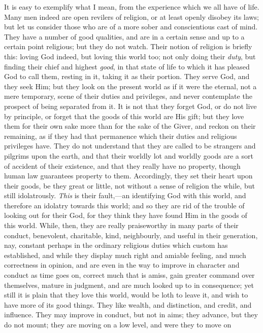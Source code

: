 It is easy to exemplify what I mean, from the experience which we
all have of life. Many men indeed are open revilers of religion, or at
least openly disobey its laws; but let us consider those who are of a
more sober and conscientious cast of mind. They have a number of good
qualities, and are in a certain sense and up to a certain point
religious; but they do not watch. Their notion of religion is briefly
this: loving God indeed, but loving this world too; not only doing
their \emph{duty}, but finding their chief and highest \emph{good}, in
that state of life to which it has pleased God to call them, resting
in it, taking it as their portion. They serve God, and they seek Him;
but they look on the present world as if it were the eternal, not a
mere temporary, scene of their duties and privileges, and never
contemplate the prospect of being separated from it. It is not that
they forget God, or do not live by principle, or forget that the goods
of this world are His gift; but they love them for their own sake more
than for the sake of the Giver, and reckon on their remaining, as if
they had that permanence which their duties and religious privileges
have. They do not understand that they are called to be strangers and
pilgrims upon the earth, and that their worldly lot and worldly goods
are a sort of accident of their existence, and that they really have
no property, though human law guarantees property to them.
Accordingly, they set their heart upon their goods, be they great or
little, not without a sense of religion the while, but still
idolatrously. \emph{This} is their fault,—an identifying God with
this world, and therefore an idolatry towards this world; and so they
are rid of the trouble of looking out for their God, for they think
they have found Him in the goods of this world. While, then, they are
really praiseworthy in many parts of their conduct, benevolent,
charitable, kind, neighbourly, and useful in their generation, nay,
constant perhaps in the ordinary religious duties which custom has
established, and while they display much right and amiable feeling,
and much correctness in opinion, and are even in the way to improve in
character and conduct as time goes on, correct much that is amiss,
gain greater command over themselves, mature in judgment, and are much
looked up to in consequence; yet still it is plain that they love this
world, would be loth to leave it, and wish to have more of its good
things. They like wealth, and distinction, and credit, and influence.
They may improve in conduct, but not in aims; they advance, but they
do not mount; they are moving on a low level, and were they to move on
